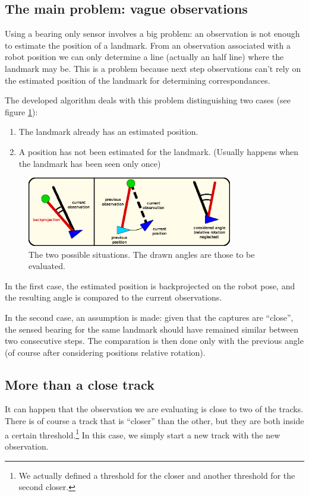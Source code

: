 \subsection{The main problem: vague observations}
Using a bearing only sensor involves a big problem: an observation is not enough to estimate the position of a landmark.
From an observation associated with a robot position we can only determine a line (actually an half line) where the landmark may be.
This is a problem because next step observations can't rely on the estimated position of the landmark for determining correspondances.

The developed algorithm deals with this problem distinguishing two cases (see figure \ref{fig:observation_association}):
\begin{enumerate}
  \item The landmark already has an estimated position.
  \item A position has not been estimated for the landmark. (Usually happens when the landmark has been seen only once)
\end{enumerate}
\begin{figure}[htbp]
  \centering
    \includegraphics[width=0.8\textwidth]{images/observation_association.png}
  \caption{The two possible situations. The drawn angles are those to be evaluated.}
  \label{fig:observation_association}
\end{figure}
In the first case, the estimated position is backprojected on the robot pose, and the resulting angle is compared to the current observations.

In the second case, an assumption is made: given that the captures are ``close'', the sensed bearing for the same landmark should have remained similar between two consecutive steps. The comparation is then done only with the previous angle (of course after considering positions relative rotation).

\subsection{More than a close track}\label{subsec:twotracks}
It can happen that the observation we are evaluating is close to two of the tracks. There is of course a track that is ``closer'' than the other, but they are both inside a certain threshold.\footnote{We actually defined a threshold for the closer and another threshold for the second closer.}
In this case, we simply start a new track with the new observation.

